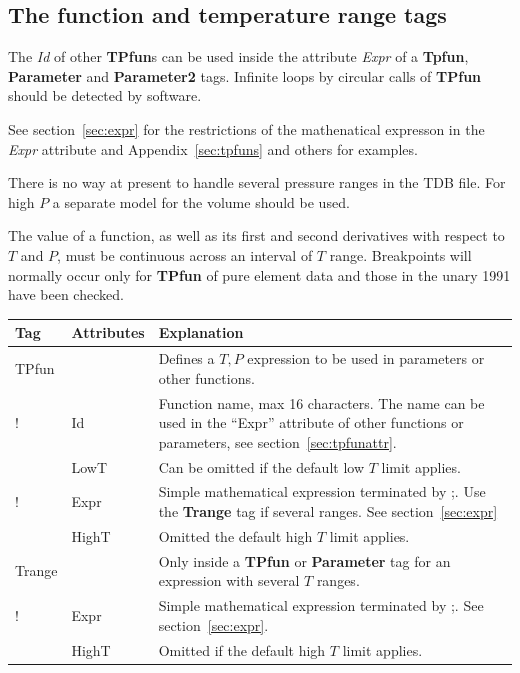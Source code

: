 \documentclass{article}
\begin{document}
\subsection{The function and temperature range tags}\label{sec:tpfun}

The {\em Id} of other {\bf TPfun}s can be used inside the attribute
{\em Expr} of a {\bf Tpfun}, {\bf Parameter} and {\bf Parameter2}
tags.  Infinite loops by circular calls of {\bf TPfun} should be
detected by software.

See section~\ref{sec:expr} for the restrictions of the mathenatical
expresson in the {\em Expr} attribute and Appendix~\ref{sec:tpfuns}
and others for examples.

There is no way at present to handle several pressure ranges in the
TDB file.  For high $P$ a separate model for the volume should be
used.

The value of a function, as well as its first and second derivatives
with respect to $T$ and $P$, must be continuous across an interval of
$T$ range.  Breakpoints will normally occur only for {\bf TPfun} of
pure element data and those in the unary 1991 have been checked.

\begin{tabular}{|p{} p{} p{}|}\hline
  Tag & Attributes & Explanation\\\hline

  TPfun & & Defines a $T, P$ expression to be used in parameters or other functions.\\
!        & Id & Function name, max 16 characters. The name can be used in the ``Expr'' attribute of other functions or parameters, see section~\ref{sec:tpfunattr}.\\
        & LowT & Can be omitted if the default low $T$ limit applies.\\
!       & Expr &  Simple mathematical expression terminated by ;.   Use the {\bf Trange} tag if several ranges.  See section~\ref{sec:expr}\\
        & HighT & Omitted the default high $T$ limit applies.\\\hline

  Trange & & Only inside a {\bf TPfun} or {\bf Parameter} tag for an expression with several $T$ ranges.\\ 
!         & Expr & Simple mathematical expression terminated by ;.  See section~\ref{sec:expr}.\\
         & HighT & Omitted if the default high $T$ limit applies.\\\hline
\end{tabular}
\end{document}
